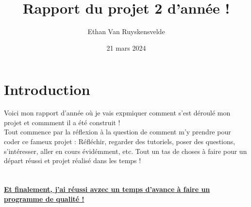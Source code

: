 \documentclass{article}
\title{Rapport du projet 2 d'année !}
\author{Ethan Van Ruyskensvelde}
\date{21 mars 2024}
\begin{document}
\maketitle

\section{Introduction}
Voici mon rapport d'année où je vais expmiquer comment s'est déroulé mon projet et commment il a été construit !\\
Tout commence par la réflexion à la question de comment m'y prendre pour coder ce fameux projet : 
Réfléchir, regarder des tutoriels, poser des questions, s'intéresser, aller en cours évidémment, etc. Tout un tas de 
choses à faire pour un départ réussi et projet réalisé dans les temps !\\\\\\\textbf{\underline{Et finalement, j'ai réussi avzec un temps d'avance à faire un programme de qualité !}}
\end{document}
